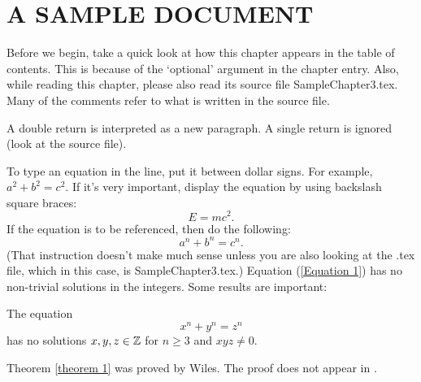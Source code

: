 \chapter[A sample document, eh?]{A SAMPLE DOCUMENT}%

Before we begin, take a quick look at how this chapter appears in
the table of contents.  This is because of the `optional' argument
in the chapter entry.  Also, while reading this chapter, please
also read its source file SampleChapter3.tex.  Many of the
comments refer to what is written in the source file.

A double return is interpreted as a new paragraph. A single return
is ignored (look at the source file).

To type an equation in the line, put it between dollar signs.  For
example, $a^2+b^2=c^2$.  If it's very important, display the
equation by using backslash square braces:
\[
E=mc^2.
\]
If the equation is to be referenced, then do the following:
\begin{equation}\label{Equation 1}%
a^n+b^n=c^n.
\end{equation}
(That instruction doesn't make much sense unless you are also
looking at the .tex file, which in this case, is
SampleChapter3.tex.)  Equation (\ref{Equation 1}) has no
non-trivial solutions in the integers. Some results are important:

\begin{theorem}\label{theorem 1}  The equation
\[
x^n+y^n=z^n
\]
has no solutions $x,y,z\in \Bbb Z$ for $n\geq 3$ and $xyz\neq 0$.
\end{theorem}

Theorem \ref{theorem 1} was proved by Wiles.  The proof does not
appear in \cite{B1}.

